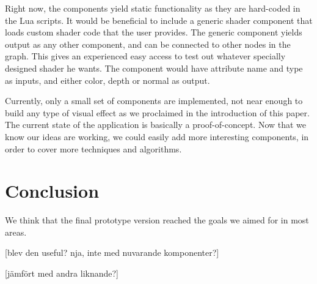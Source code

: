 
Right now, the components yield static functionality as they are hard-coded in the Lua scripts. It would be beneficial to include a generic shader component that loads custom shader code that the user provides. The generic component yields output as any other component, and can be connected to other nodes in the graph. This gives an experienced easy access to test out whatever specially designed shader he wants. The component would have attribute name and type as inputs, and either color, depth or normal as output.

Currently, only a small set of components are implemented, not near enough to build any type of visual effect as we proclaimed in the introduction of this paper. The current state of the application is basically a proof-of-concept. Now that we know our ideas are working, we could easily add more interesting components, in order to cover more techniques and algorithms.

\chapter{Conclusion}
We think that the final prototype version reached the goals we aimed for in most areas.

[blev den useful? nja, inte med nuvarande komponenter?]

[jämfört med andra liknande?]

